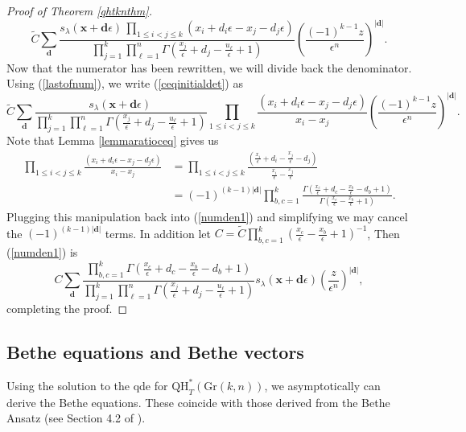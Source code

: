 \documentclass[12pt]{article}
\theoremstyle{plain}
\theoremstyle{definition}
\newcommand{\xb}{\boldsymbol{x}}
\newcommand{\db}{\boldsymbol{d}}
\begin{document}
\begin{proof}[Proof of Theorem \ref{qhtknthm}]
\begin{equation}
    \widetilde{C}  \sum_{\db} \frac{s_\lambda (\xb+\db \epsilon) \, \prod_{1\leq i <j \leq k} (x_i+d_i\epsilon - x_j - d_j \epsilon)}{\prod_{j=1} ^k  \prod_{\ell=1} ^n \Gamma \left(\frac{x_j}{\epsilon}+d_j- \frac{u_\ell}{\epsilon}+1\right)} \left(\frac{(-1)^{k-1} z}{\epsilon^n}\right)^{|\db|}. 
\end{equation}
Now that the numerator has been rewritten, we will divide back the denominator. Using (\ref{lastofnum}), we write (\ref{ceqinitialdet}) as
\begin{equation}\label{numden1}
     \widetilde{C}  \sum_{\db} \frac{s_\lambda (\xb+\db \epsilon) \, }{\prod_{j=1} ^k  \prod_{\ell=1} ^n \Gamma \left(\frac{x_j}{\epsilon}+d_j- \frac{u_\ell}{\epsilon}+1\right)}\prod_{1\leq i <j \leq k} \frac{(x_i+d_i\epsilon - x_j - d_j \epsilon)}{x_i-x_j} \left(\frac{(-1)^{k-1} z}{\epsilon^n}\right)^{|\db|}. 
\end{equation}
Note that Lemma \ref{lemmaratioceq} gives us
\begin{align*}
    \prod_{1\leq i <j \leq k} \frac{(x_i+d_i\epsilon - x_j - d_j \epsilon)}{x_i-x_j} &= \prod_{1\leq i <j \leq k} \frac{(\frac{x_i}{\epsilon}+d_i - \frac{x_j}{\epsilon} - d_j )}{\frac{x_i}{\epsilon}-\frac{x_j}{\epsilon}}\\
    &=(-1)^{(k-1)|\db|}\prod_{b,c=1} ^k \frac{\Gamma \left(\frac{x_c}{\epsilon}+d_c - \frac{x_b}{\epsilon} - d_b+1 \right)}{\Gamma \left(\frac{x_c}{\epsilon} - \frac{x_b}{\epsilon}  +1\right)}.
\end{align*}
Plugging this manipulation back into (\ref{numden1}) and simplifying we may cancel the $(-1)^{(k-1)|\db|}$ terms. In addition let $C=\widetilde{C} \prod_{b,c=1} ^k \left(\frac{x_c}{\epsilon} - \frac{x_b}{\epsilon}  +1\right)^{-1}$, Then (\ref{numden1}) is
\begin{equation}
    C  \sum_{\db} \frac{\prod_{b,c=1} ^k {\Gamma \left(\frac{x_c}{\epsilon}+d_c - \frac{x_b}{\epsilon} - d_b+1 \right)}  }{\prod_{j=1} ^k  \prod_{\ell=1} ^n \Gamma \left(\frac{x_j}{\epsilon}+d_j- \frac{u_\ell}{\epsilon}+1\right)}s_\lambda (\xb+\db \epsilon)\left(\frac{ z}{\epsilon^n}\right)^{|\db|}, 
\end{equation}
completing the proof.
\end{proof}

\subsection{Bethe equations and Bethe vectors}
Using the solution to the qde for $\mathrm{QH}^*_T(\mathrm{Gr}(k,n))$, we asymptotically can derive the Bethe equations. These coincide with those derived from the Bethe Ansatz (see Section 4.2 of \cite{gorbkorff2017}).
\end{document}
